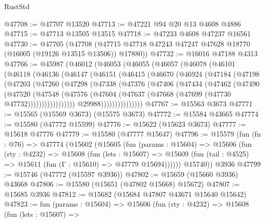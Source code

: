 \begin{lexlean}{RustStd}
\begin{coremodule}
@47708 := @47707 @13520
@47713 := @47221 @94 @20 @13 @4608 @4886
@47715 := @47713 @13505 @13515
@47718 := @47233 @4608 @47237 @16561
@47730 := @47705
    (@47708 (@47715 @47718 @47243 @47247 @47628 @18770 (@16005 (@19126 @13515 @13506)) @17880))
@47732 := @16016 @47188 @4313
@47766 := @45987
    (@46012
      (@46053
        (@46055
          (@46057
            (@46078
              (@46101
                (@46118
                  (@46136
                    (@46147
                      (@46151
                        (@46415
                          (@46670
                            (@46924
                              (@47184
                                (@47198
                                  (@47203
                                    (@47260
                                      (@47298
                                        (@47338
                                          (@47376
                                            (@47406
                                              (@47434
                                                (@47462
                                                  (@47490
                                                    (@47520
                                                      (@47548
                                                        (@47576
                                                          (@47604
                                                            (@47637
                                                              (@47668
                                                                (@47699
                                                                  (@47730 @47732)))))))))))))))))
                                  @29988)))))))))))))))
@47767 := @15563 @3673
@47771 := @15565 (@15569 @3673) (@15575 @3673)
@47772 := @15584 @43665
@47774 := @15580 (@47772 @15599)
@47776 := @15622 (@15623 @3673)
@47777 := @15618 @47776
@47779 := @15580 (@47777 @15647)
@47796 := @15579
    (fun (fn : @76) =>
    @47774
      (@15602
        (@15605
          (fun (params : @15604) =>
          @15606
            (fun (rty : @4232) =>
            @15608
              (fun (lets : @15607) =>
              @15609 (fun (tail : @4525) => @15611 (fun (Γ : @15610) => @47779 @15694))))))
        @15740))
    @3936
@47799 := @15746 (@47772 (@15597 @3936))
@47802 := @15659 (@15660 @3936) @43668
@47806 := @15580 (@15651 (@47802 @15668) @15672)
@47807 := @15685 @3936
@47812 := @15682 (@15684 @47807 @43671 @15640 @15642)
@47823 := fun (params : @15604) =>
  @15606
    (fun (rty : @4232) =>
    @15608
      (fun (lets : @15607) =>

\end{coremodule}
\end{lexlean}

